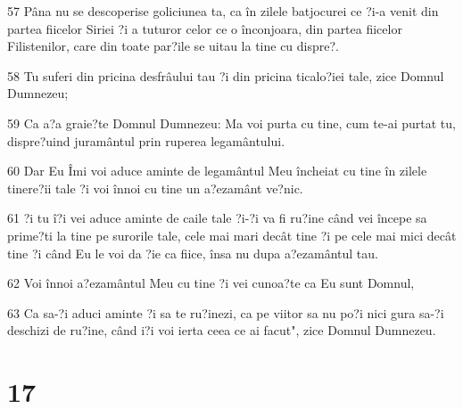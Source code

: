 \par 57 Pâna nu se descoperise goliciunea ta, ca în zilele batjocurei ce ?i-a venit din partea fiicelor Siriei ?i a tuturor celor ce o înconjoara, din partea fiicelor Filistenilor, care din toate par?ile se uitau la tine cu dispre?.
\par 58 Tu suferi din pricina desfrâului tau ?i din pricina ticalo?iei tale, zice Domnul Dumnezeu;
\par 59 Ca a?a graie?te Domnul Dumnezeu: Ma voi purta cu tine, cum te-ai purtat tu, dispre?uind juramântul prin ruperea legamântului.
\par 60 Dar Eu Îmi voi aduce aminte de legamântul Meu încheiat cu tine în zilele tinere?ii tale ?i voi înnoi cu tine un a?ezamânt ve?nic.
\par 61 ?i tu î?i vei aduce aminte de caile tale ?i-?i va fi ru?ine când vei începe sa prime?ti la tine pe surorile tale, cele mai mari decât tine ?i pe cele mai mici decât tine ?i când Eu le voi da ?ie ca fiice, însa nu dupa a?ezamântul tau.
\par 62 Voi înnoi a?ezamântul Meu cu tine ?i vei cunoa?te ca Eu sunt Domnul,
\par 63 Ca sa-?i aduci aminte ?i sa te ru?inezi, ca pe viitor sa nu po?i nici gura sa-?i deschizi de ru?ine, când i?i voi ierta ceea ce ai facut", zice Domnul Dumnezeu.

\chapter{17}

